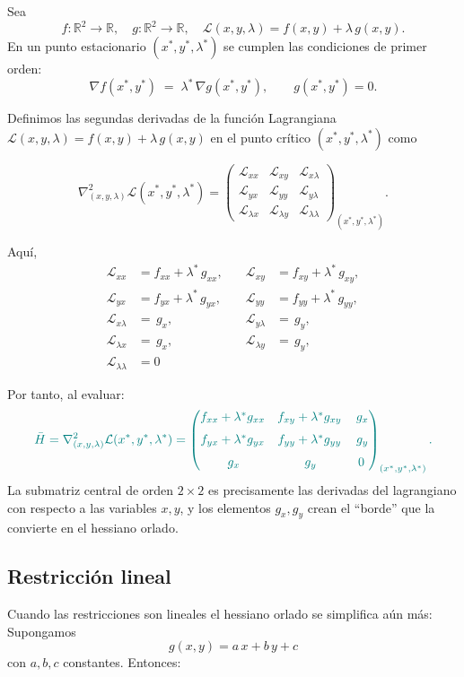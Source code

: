 \documentclass{article}
\newcommand{\R}{\ensuremath{\mathbb{R}}}
\begin{document}
Sea
\[
f:\R^2\to\R,
\quad
g:\R^2\to\R,
\quad
\mathcal L(x,y,\lambda)=f(x,y)+\lambda\,g(x,y).
\]
En un punto estacionario $(x^*,y^*,\lambda^*)$ se cumplen las condiciones de primer orden:
\[
\nabla f(x^*,y^*) \;=\;\lambda^*\,\nabla g(x^*,y^*),
\qquad
g(x^*,y^*)=0.
\]


Definimos las segundas derivadas de la función Lagrangiana
\(\mathcal L(x,y,\lambda)=f(x,y)+\lambda\,g(x,y)\) en el punto crítico \((x^*,y^*,\lambda^*)\) como

\[
\nabla^2_{(x,y,\lambda)}\mathcal L(x^*,y^*,\lambda^*)
=
\begin{pmatrix}
\mathcal L_{xx} & \mathcal L_{xy} & \mathcal L_{x\lambda} \\[6pt]
\mathcal L_{yx} & \mathcal L_{yy} & \mathcal L_{y\lambda} \\[6pt]
\mathcal L_{\lambda x} & \mathcal L_{\lambda y} & \mathcal L_{\lambda\lambda}
\end{pmatrix}_{(x^*,y^*,\lambda^*)}.
\]

Aquí,
\[
\begin{aligned}
\mathcal L_{xx}&=f_{xx}+\lambda^*\,g_{xx}, 
&\quad
\mathcal L_{xy}&=f_{xy}+\lambda^*\,g_{xy},\\
\mathcal L_{yx}&=f_{yx}+\lambda^*\,g_{yx}, 
&\quad
\mathcal L_{yy}&=f_{yy}+\lambda^*\,g_{yy},\\[4pt]
\mathcal L_{x\lambda}&=\,g_x,
&\quad
\mathcal L_{y\lambda}&=\,g_y,\\
\mathcal L_{\lambda x}&=\,g_x,
&\quad
\mathcal L_{\lambda y}&=\,g_y,\\[4pt]
\mathcal L_{\lambda\lambda}&=0
\end{aligned}
\]

Por tanto, al evaluar:
\[\color{teal}
\bar{H}=\nabla^2_{(x,y,\lambda)}\mathcal L(x^*,y^*,\lambda^*)
=
\begin{pmatrix}
f_{xx}+\lambda^*g_{xx} & f_{xy}+\lambda^*g_{xy} & \,g_x \\[6pt]
f_{yx}+\lambda^*g_{yx} & f_{yy}+\lambda^*g_{yy} & \,g_y \\[6pt]
\,g_x & \,g_y & 0
\end{pmatrix}_{(x^*,y^*,\lambda^*)}.
\]
La submatriz central de orden \(2\times2\) es precisamente las derivadas del lagrangiano con respecto a las variables $x,y$, y los elementos
\(g_x,g_y\) crean el “borde” que la convierte en el hessiano orlado.


\subsection*{Restricción lineal}
Cuando las restricciones son lineales el hessiano orlado se simplifica aún más: Supongamos 
\[
g(x,y)=a\,x + b\,y + c
\]
con \(a,b,c\) constantes. Entonces:
\end{document}
